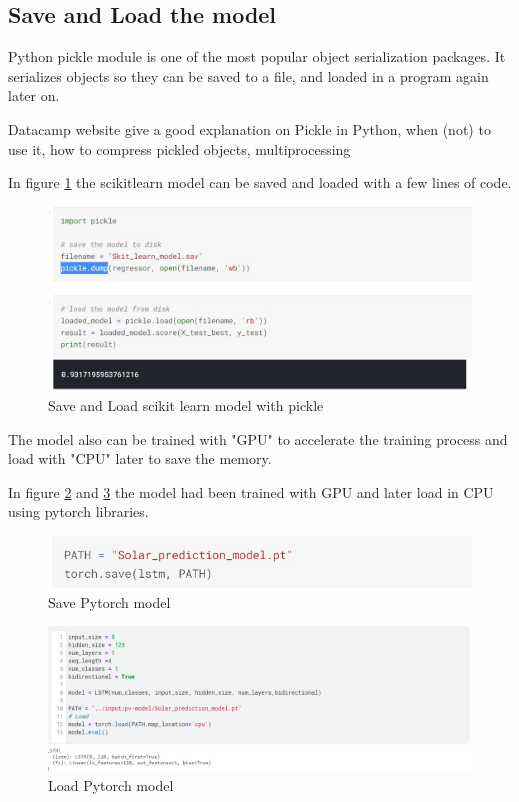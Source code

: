 \subsection{Save and Load the model}

Python pickle module is one of the most popular object serialization packages. It serializes objects so they can be saved to a file, and loaded in a program again later on. 

Datacamp website give a good explanation on Pickle in Python, when (not) to use it, how to compress pickled objects, multiprocessing \cite{Pickle}

In figure \ref{figure:scikitpickle} the scikitlearn model can be saved and loaded with a few lines of code.

\begin{figure}[H]
	\centering
	\includegraphics[width=0.8\columnwidth]{Pictures/scikitlearn_pickel.jpg}
	\caption[Short title]{Save and Load scikit learn model with pickle}
	\label{figure:scikitpickle}
\end{figure}

The model also can be trained with "GPU" to accelerate the training process and load with "CPU" later to save the memory.

In figure \ref{figure:savetorch} and \ref{figure:loadtorch} the model had been trained with GPU and later load in CPU using pytorch libraries. 

\begin{figure}[H]
	\centering
	\includegraphics[width=0.8\columnwidth]{Pictures/save_LSTM.jpg}
	\caption[Short title]{Save Pytorch model}
	\label{figure:savetorch}
\end{figure}

\begin{figure}[H]
	\centering
	\includegraphics[width=0.8\columnwidth]{Pictures/load lstm.png}
	\caption[Short title]{Load Pytorch model}
	\label{figure:loadtorch}
\end{figure}

\newpage